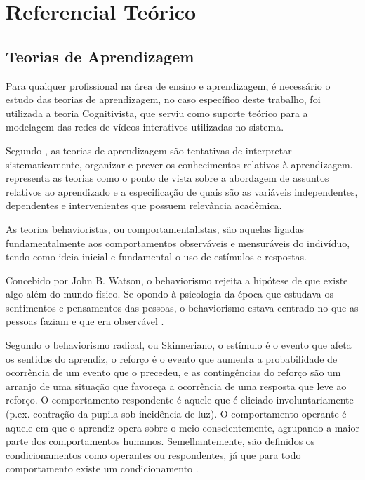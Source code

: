 \chapter[Referencial Teórico]{Referencial Teórico}

\section{Teorias de Aprendizagem}

Para qualquer profissional na área de ensino e aprendizagem, é necessário o estudo das teorias de aprendizagem, no caso específico deste trabalho, foi utilizada a teoria Cognitivista, que serviu como suporte teórico para a modelagem das redes de vídeos interativos utilizadas no sistema.

Segundo \cite{moreira1999}, as teorias de aprendizagem são tentativas de interpretar sistematicamente, organizar e prever os conhecimentos relativos à aprendizagem. \cite{hill2002} representa as teorias como o ponto de vista sobre a abordagem de assuntos relativos ao aprendizado e a especificação de quais são as variáveis independentes, dependentes e intervenientes que possuem relevância acadêmica.

As teorias behavioristas, ou comportamentalistas, são aquelas ligadas fundamentalmente aos comportamentos observáveis e mensuráveis do indivíduo, tendo como ideia inicial e fundamental o uso de estímulos e respostas.

Concebido por John B. Watson, o behaviorismo rejeita a hipótese de que existe algo além do mundo físico. Se opondo à psicologia da época que estudava os sentimentos e pensamentos das pessoas, o behaviorismo estava centrado no que as pessoas faziam e que era observável \cite{moreira1999}.

Segundo o behaviorismo radical, ou Skinneriano, o estímulo é o evento que afeta os sentidos do aprendiz, o reforço é o evento que aumenta a probabilidade de ocorrência de um evento que o precedeu, e as contingências do reforço são um arranjo de uma situação que favoreça a ocorrência de uma resposta que leve ao reforço. O comportamento respondente é aquele que é eliciado involuntariamente (p.ex. contração da pupila sob incidência de luz). O comportamento operante é aquele em que o aprendiz opera sobre o meio conscientemente, agrupando a maior parte dos comportamentos humanos. Semelhantemente, são definidos os condicionamentos como operantes ou respondentes, já que para todo comportamento existe um condicionamento \cite{fragelli2010, silva2005}. 

